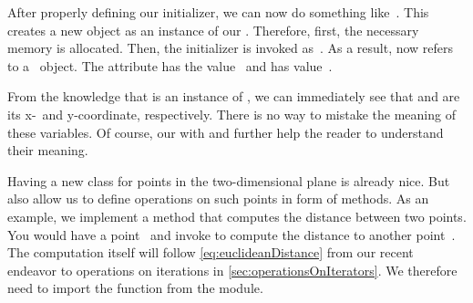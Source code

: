 %
%
%
After properly defining our initializer, we can now do something like~.
This creates a new object as an instance of our  .
Therefore, first, the necessary memory is allocated.
Then, the initializer is invoked as~.
As a result,  now refers to a ~object.
The attribute  has the value~ and  has value~.

From the knowledge that  is an instance of , we can immediately see that  and  are its x-\ and y\nobreakdashes-coordinate, respectively.
There is no way to mistake the meaning of these variables.
Of course, our  with  and  further help the reader to understand their meaning.

Having a new class for points in the two-dimensional plane is already nice.
But  also allow us to define operations on such points in form of methods.
As an example, we implement a method  that computes the distance between two points.
You would have a point~ and invoke  to compute the distance to another point~.
The computation itself will follow \cref{eq:euclideanDistance} from our recent endeavor to operations on iterations in \cref{sec:operationsOnIterators}.
We therefore need to import the  function from the  module.


